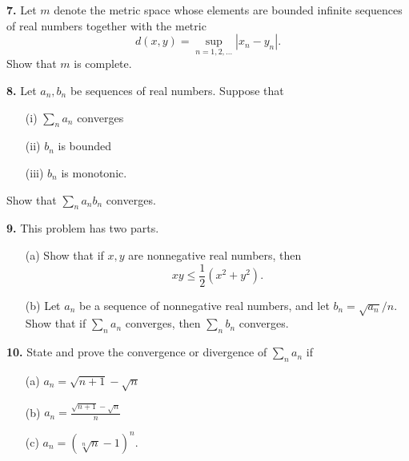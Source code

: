 \documentclass[12pt]{article}
\begin{document}
\medskip

\noindent \textbf{7.} Let $m$ denote the metric space whose elements are bounded infinite sequences of real numbers together with the metric 
\[
d(x,y) = \sup_{n=1, 2, \ldots} |x_n - y_n|.
\]
Show that $m$ is complete. 

\medskip

\noindent \textbf{8.} Let $a_n, b_n$ be sequences of real numbers. Suppose that 
\begin{enumerate}
\item[(i)] $\sum_n a_n$ converges
\item[(ii)] $b_n$ is bounded
\item[(iii)] $b_n$ is monotonic.
\end{enumerate}
Show that $\sum_n a_nb_n$ converges. 

\medskip

\noindent \textbf{9.} This problem has two parts. 
\begin{enumerate}
\item[(a)] Show that if $x,y$ are nonnegative real numbers, then 
\[
xy \leqslant \frac{1}{2} (x^2 + y^2). 
\]
\item[(b)] Let $a_n$ be a sequence of nonnegative real numbers, and let $b_n = \sqrt{a_n}/n$. Show that if $\sum_n a_n$ converges, then $\sum_n b_n$ converges. 
\end{enumerate}

\medskip

\noindent \textbf{10.} State and prove the convergence or divergence of $\sum_n a_n$ if 
\begin{enumerate}
\item[(a)] $a_n = \sqrt{n+1} - \sqrt{n}$
\item[(b)] $a_n = \frac{\sqrt{n+1} - \sqrt{n}}{n}$ 
\item[(c)] $a_n = (\sqrt[n]{n} - 1)^n$.
\end{enumerate}
\end{document}
